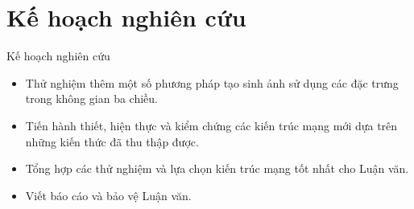 \section{Kế hoạch nghiên cứu}\label{sec:intro}
\frame{\tableofcontents[currentsection]}
\begin{frame}{Kế hoạch nghiên cứu}

\begin{itemize}
    \item <1-> Thử nghiệm thêm một số phương pháp tạo sinh ảnh sử dụng các đặc trưng trong không gian ba chiều.
    \item <2-> Tiến hành thiết, hiện thực và kiểm chứng các kiến trúc mạng mới dựa trên những kiến thức đã thu thập được.
    \item <3-> Tổng hợp các thử nghiệm và lựa chọn kiến trúc mạng tốt nhất cho Luận văn.
    \item <4-> Viết báo cáo và bảo vệ Luận văn.
\end{itemize}
\end{frame}

